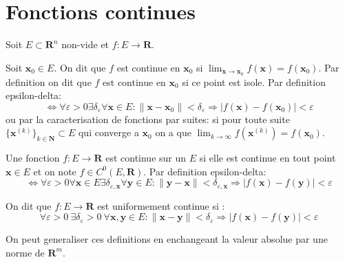 \section{Fonctions continues}
Soit $E\subset \mathbf{R}^{n}$ non-vide et $f:E\to \mathbf{R}$.
\begin{definition}[Continuite]
Soit $\boldsymbol{x}_{0}\in E$. On dit que $f$ est continue en $\boldsymbol{x}_{0}$ si $\lim_{ \boldsymbol{x} \to \boldsymbol{x}_{0} }f(\boldsymbol{x})=f(\boldsymbol{x}_{0})$. Par definition on dit que $f$ est continue en $\boldsymbol{x}_{0}$ si ce point est isole. Par definition epsilon-delta:
$$
\Leftrightarrow \forall\varepsilon>0\exists\delta_{\varepsilon} \forall \boldsymbol{x}\in E:\lVert \boldsymbol{x}-\boldsymbol{x}_{0} \rVert <\delta_{\varepsilon} \Rightarrow |f(\boldsymbol{x})-f(\boldsymbol{x}_{0})|<\varepsilon
$$
ou par la caracterisation de fonctions par suites: si pour toute suite $\{ \boldsymbol{x}^{(k)} \}_{k\in \mathbf{N}}\subset E$ qui converge a $\boldsymbol{x}_{0}$ on a que $\lim_{ k \to \infty }f(\boldsymbol{x}^{(k)})=f(\boldsymbol{x}_{0})$.
\end{definition}
\begin{definition}
Une fonction $f:E\to \mathbf{R}$ est continue sur un $E$ si elle est continue en tout point $\boldsymbol{x}\in E$ et on note $f\in C^{0}(E,\mathbf{R})$. Par definition epsilon-delta:
$$
\Leftrightarrow\forall\varepsilon>0\forall \boldsymbol{x}\in E\exists\delta _{\varepsilon,\boldsymbol{x}}\forall \boldsymbol{y}\in E:\lVert \boldsymbol{y}-\boldsymbol{x} \rVert <\delta _{\varepsilon,\boldsymbol{x}} \Rightarrow |f(\boldsymbol{x})-f(\boldsymbol{y})|<\varepsilon
$$\end{definition}
\begin{definition}
On dit que $f:E\to \mathbf{R}$ est uniformement continue si :
$$
\forall\varepsilon>0~\exists\delta _{\varepsilon}>0~\forall \boldsymbol{x},\boldsymbol{y}\in E:\lVert \boldsymbol{x}-\boldsymbol{y} \rVert <\delta_{\varepsilon} \Rightarrow |f(\boldsymbol{x})-f(\boldsymbol{y})|<\varepsilon
$$
\end{definition}
\begin{remark}
On peut generaliser ces definitions en enchangeant la valeur absolue par une norme de $\mathbf{R}^{m}$.
\end{remark}

